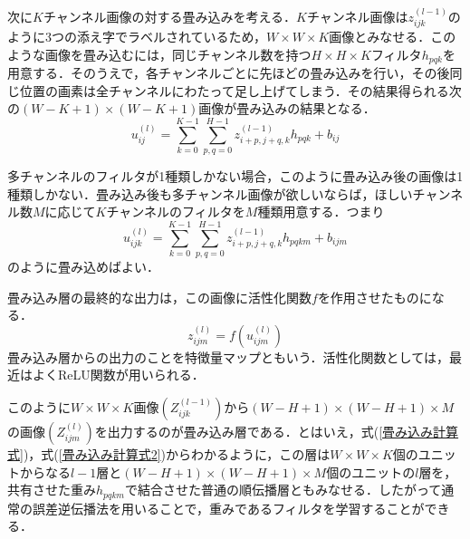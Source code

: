 \documentclass[a4paper,11pt]{jsreport}
\begin{document}
次に$K$チャンネル画像の対する畳み込みを考える．$K$チャンネル画像は$z_{ijk}^{(l-1)}$のように3つの添え字でラベルされているため，$W \times W \times K$画像とみなせる．このような画像を畳み込むには，同じチャンネル数を持つ$H \times H \times K$フィルタ$h_{pqk}$を用意する．そのうえで，各チャンネルごとに先ほどの畳み込みを行い，その後同じ位置の画素は全チャンネルにわたって足し上げてしまう．その結果得られる次の$(W-K+1)\times(W-K+1)$画像が畳み込みの結果となる．
\begin{equation}
  u_{ij}^{(l)}
  = \sum_{k=0}^{K-1}\sum_{p,q=0}^{H-1} z_{i+p,j+q,k}^{(l-1)} h_{pqk} + b_{ij}
\end{equation} \par
多チャンネルのフィルタが1種類しかない場合，このように畳み込み後の画像は1種類しかない．畳み込み後も多チャンネル画像が欲しいならば，ほしいチャンネル数$M$に応じて$K$チャンネルのフィルタを$M$種類用意する．つまり
\begin{equation}
  u_{ijk}^{(l)}
  = \sum_{k=0}^{K-1}\sum_{p,q=0}^{H-1} z_{i+p,j+q,k}^{(l-1)} h_{pqkm} + b_{ijm}
  \label{畳み込み計算式}
\end{equation}
のように畳み込めばよい．\par
畳み込み層の最終的な出力は，この画像に活性化関数$f$を作用させたものになる．
\begin{equation}
  z_{ijm}^{(l)}
  = f(u_{ijm}^{(l)})
  \label{畳み込み計算式2}
\end{equation}
畳み込み層からの出力のことを特徴量マップともいう．活性化関数としては，最近はよくReLU関数が用いられる．\par
このように$W \times W \times K$画像$(Z_{ijk}^{(l-1)})$から$(W-H+1) \times (W-H+1) \times M$の画像$(Z_{ijm}^{(l)})$を出力するのが畳み込み層である．とはいえ，式(\ref{畳み込み計算式})，式(\ref{畳み込み計算式2})からわかるように，この層は$W \times W \times K$個のユニットからなる$l-1$層と$(W-H+1) \times (W-H+1) \times M$個のユニットの$l$層を，共有させた重み${h_{pqkm}}$で結合させた普通の順伝播層ともみなせる．したがって通常の誤差逆伝播法を用いることで，重みであるフィルタを学習することができる．
\end{document}
